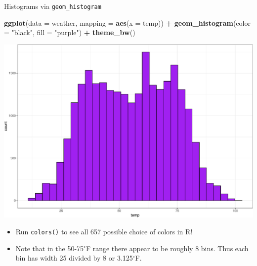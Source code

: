 \documentclass[
  ignorenonframetext,
]{beamer}
\newenvironment{Shaded}{\begin{snugshade}}{\end{snugshade}}
\newcommand{\AttributeTok}[1]{\textcolor[rgb]{0.13,0.29,0.53}{#1}}
\newcommand{\FunctionTok}[1]{\textcolor[rgb]{0.13,0.29,0.53}{\textbf{#1}}}
\newcommand{\NormalTok}[1]{#1}
\newcommand{\SpecialCharTok}[1]{\textcolor[rgb]{0.81,0.36,0.00}{\textbf{#1}}}
\newcommand{\StringTok}[1]{\textcolor[rgb]{0.31,0.60,0.02}{#1}}
\providecommand{\tightlist}{%
  \setlength{\itemsep}{0pt}\setlength{\parskip}{0pt}}
\begin{document}
\begin{frame}[fragile]{Histograms via \texttt{geom\_histogram}}
\protect\hypertarget{histograms-via-geom_histogram-3}{}
\tiny

\begin{Shaded}
\begin{Highlighting}[]
\FunctionTok{ggplot}\NormalTok{(}\AttributeTok{data =}\NormalTok{ weather, }\AttributeTok{mapping =} \FunctionTok{aes}\NormalTok{(}\AttributeTok{x =}\NormalTok{ temp)) }\SpecialCharTok{+}
  \FunctionTok{geom\_histogram}\NormalTok{(}\AttributeTok{color =} \StringTok{"black"}\NormalTok{, }\AttributeTok{fill =} \StringTok{"purple"}\NormalTok{) }\SpecialCharTok{+} 
  \FunctionTok{theme\_bw}\NormalTok{()}
\end{Highlighting}
\end{Shaded}

\begin{center}\includegraphics[width=0.7\linewidth,height=0.5\textheight]{Week2_Lect_files/figure-beamer/unnamed-chunk-27-1} \end{center}
\normalsize

\begin{itemize}
\tightlist
\item
  Run \texttt{colors()} to see all 657 possible choice of colors in R!
\item
  Note that in the 50-75\(^{\circ}\)F range there appear to be roughly 8
  bins. Thus each bin has width 25 divided by 8 or 3.125\(^{\circ}\)F.
\end{itemize}
\end{frame}
\end{document}
